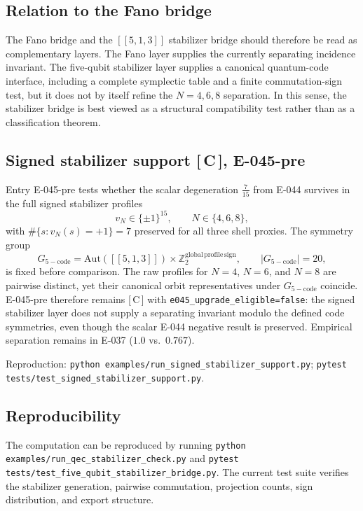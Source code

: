 \documentclass[11pt, lettersize, article]{article}
\theoremstyle{definition}
\theoremstyle{remark}
\newcommand{\evidence}[1]{\textnormal{[\,#1\,]}}
\begin{document}
\subsection{Relation to the Fano bridge}

The Fano bridge and the $[[5,1,3]]$ stabilizer bridge should therefore
be read as complementary layers.
The Fano layer supplies the currently separating incidence invariant.
The five-qubit stabilizer layer supplies a canonical quantum-code
interface, including a complete symplectic table and a finite
commutation-sign test, but it does not by itself refine the
$N=4,6,8$ separation.
In this sense, the stabilizer bridge is best viewed as a structural
compatibility test rather than as a classification theorem.

\subsection{Signed stabilizer support \evidence{C}, E-045-pre}

Entry E-045-pre tests whether the scalar degeneration $\frac{7}{15}$ from E-044
survives in the full signed stabilizer profiles
\[
  v_N \in \{\pm 1\}^{15}, \qquad N\in\{4,6,8\},
\]
with $\#\{s : v_N(s)=+1\}=7$ preserved for all three shell proxies.
The symmetry group
\[
  G_{\mathrm{5-code}} = \mathrm{Aut}([[5,1,3]]) \times \mathbb{Z}_2^{\mathrm{global\,profile\,sign}},
  \qquad |G_{\mathrm{5-code}}|=20,
\]
is fixed before comparison.
The raw profiles for $N=4$, $N=6$, and $N=8$ are pairwise distinct, yet their
canonical orbit representatives under $G_{\mathrm{5-code}}$ coincide.
E-045-pre therefore remains \evidence{C} with \texttt{e045\_upgrade\_eligible=false}:
the signed stabilizer layer does not supply a separating invariant modulo the
defined code symmetries, even though the scalar E-044 negative result is preserved.
Empirical separation remains in E-037 ($1.0$ vs.\ $0.767$).

Reproduction:
\texttt{python examples/run\_signed\_stabilizer\_support.py};
\texttt{pytest tests/test\_signed\_stabilizer\_support.py}.

\subsection{Reproducibility}

The computation can be reproduced by running
\texttt{python examples/run\_qec\_stabilizer\_check.py}
and
\texttt{pytest tests/test\_five\_qubit\_stabilizer\_bridge.py}.
The current test suite verifies the stabilizer generation, pairwise
commutation, projection counts, sign distribution, and export structure.
\end{document}
